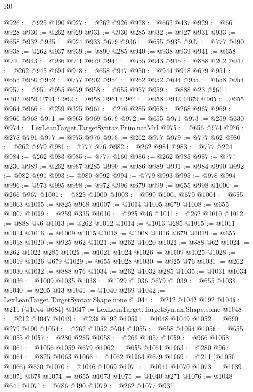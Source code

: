 \begin{lexlean}{R0}
\begin{coremodule}
@926 := @925 @190
@927 := @262 @926
@928 := @662 @437
@929 := @661 @928
@930 := @262 @929
@931 := @930 @285
@932 := @927 @931
@933 := @658 @932
@935 := @924 @933 @679
@936 := @655 @935
@937 := @777 @190
@938 := @262 @937
@939 := @890 @285
@940 := @938 @939
@941 := @658 @940
@943 := @936 @941 @679
@944 := @655 @943
@945 := @888 @202
@947 := @262 @945 @694
@948 := @658 @947
@950 := @944 @948 @679
@951 := @655 @950
@952 := @777 @202
@954 := @262 @952 @694
@955 := @658 @954
@957 := @951 @955 @679
@958 := @655 @957
@959 := @888 @23
@961 := @262 @959 @791
@962 := @658 @961
@964 := @958 @962 @679
@965 := @655 @964
@966 := @259 @325
@967 := @276 @285
@968 := @268 @967
@969 := @966 @968
@971 := @965 @969 @679
@972 := @655 @971
@973 := @259 @330
@974 := LexLeanTarget.TargetSyntax.Prim.natMul
@975 := @656 @974
@976 := @278 @791
@977 := @975 @976
@978 := @262 @977
@979 := @777 @62
@980 := @262 @979
@981 := @777 @76
@982 := @262 @981
@983 := @777 @224
@984 := @262 @983
@985 := @777 @160
@986 := @262 @985
@987 := @777 @230
@989 := @262 @987 @285
@990 := @986 @989
@991 := @984 @990
@992 := @982 @991
@993 := @980 @992
@994 := @779 @993
@995 := @978 @994
@996 := @973 @995
@998 := @972 @996 @679
@999 := @655 @998
@1000 := @266 @967
@1001 := @825 @1000
@1003 := @999 @1001 @679
@1004 := @655 @1003
@1005 := @825 @968
@1007 := @1004 @1005 @679
@1008 := @655 @1007
@1009 := @259 @335
@1010 := @925 @46
@1011 := @262 @1010
@1012 := @888 @46
@1013 := @262 @1012
@1014 := @1013 @285
@1015 := @1011 @1014
@1016 := @1009 @1015
@1018 := @1008 @1016 @679
@1019 := @655 @1018
@1020 := @925 @62
@1021 := @262 @1020
@1022 := @888 @62
@1024 := @262 @1022 @285
@1025 := @1021 @1024
@1026 := @1009 @1025
@1028 := @1019 @1026 @679
@1029 := @655 @1028
@1030 := @925 @76
@1031 := @262 @1030
@1032 := @888 @76
@1034 := @262 @1032 @285
@1035 := @1031 @1034
@1036 := @1009 @1035
@1038 := @1029 @1036 @679
@1039 := @655 @1038
@1040 := @205 @13
@1041 := @1040 @269
@1042 := LexLeanTarget.TargetSyntax.Shape.none
@1044 := @212 @1042 @192
@1046 := @211 (@1044 @684)
@1047 := LexLeanTarget.TargetSyntax.Shape.some
@1048 := @212 @1047
@1049 := @236 @192
@1050 := @1048 @1049
@1052 := @690 @279 @190
@1054 := @262 @1052 @704
@1055 := @658 @1054
@1056 := @655 @1055
@1057 := @280 @285
@1058 := @268 @1057
@1059 := @966 @1058
@1061 := @1056 @1059 @679
@1062 := @655 @1061
@1063 := @280 @967
@1064 := @825 @1063
@1066 := @1062 @1064 @679
@1069 := @211 (@1050 @1066) @630
@1070 := @1046 @1069
@1071 := @1041 @1070
@1073 := @1039 @1071 @679
@1074 := @655 @1073
@1075 := @1040 @271
@1076 := @1048 @641
@1077 := @786 @190
@1079 := @262 @1077 @931

\end{coremodule}
\end{lexlean}
